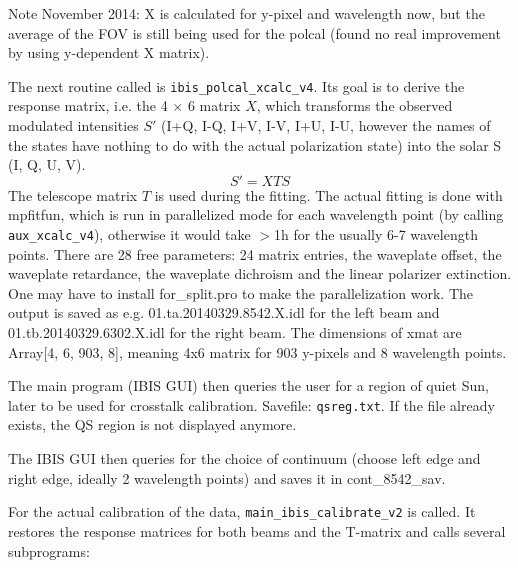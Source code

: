 \documentclass[a4paper,12pt]{article}
\begin{document}
Note November 2014: X is calculated for y-pixel and wavelength now, but the average of the FOV is still being used for the polcal (found no real improvement by using y-dependent X matrix).

The next routine called is  \texttt{ibis\_polcal\_xcalc\_v4}. Its goal is to derive the response matrix, i.e. the 4 $\times$ 6 matrix $X$, which transforms the observed modulated intensities $S'$ (I+Q, I-Q, I+V, I-V, I+U, I-U, however the names of the states have nothing to do with the actual polarization state) into the solar S (I, Q, U, V). 
\begin{equation}
S' = X T S
\end{equation}
 The telescope matrix $T$ is used during the fitting. The actual fitting is done with mpfitfun, which is run in parallelized mode for each wavelength point (by calling \texttt{aux\_xcalc\_v4}), otherwise it would take $>$1h for the usually 6-7 wavelength points. There are 28 free parameters: 24 matrix entries, the waveplate offset, the waveplate retardance, the waveplate dichroism and the linear polarizer extinction. One may have to install for\_split.pro to make the parallelization work. The output is saved as e.g. 01.ta.20140329.8542.X.idl for the left beam and 01.tb.20140329.6302.X.idl for the right beam. The dimensions of xmat are Array[4, 6, 903, 8], meaning 4x6 matrix for 903 y-pixels and 8 wavelength points.

The main program (IBIS GUI) then queries the user for a region of quiet Sun, later to be used for crosstalk calibration. Savefile: \texttt{qsreg.txt}. If the file already exists, the QS region is not displayed anymore.

The IBIS GUI then queries for the choice of continuum (choose left edge and right edge, ideally 2 wavelength points) and saves it in cont\_8542\_sav.

For the actual calibration of the data, \texttt{main\_ibis\_calibrate\_v2} is called. It restores the response matrices for both beams and the T-matrix and calls several subprograms: 
\end{document}
